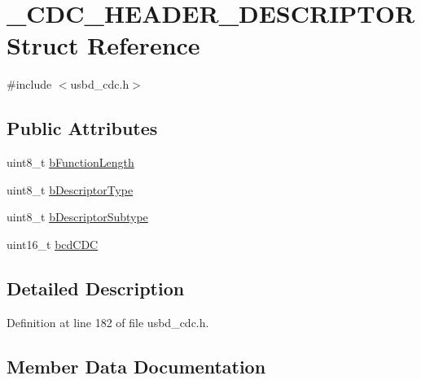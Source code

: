 \hypertarget{struct___c_d_c___h_e_a_d_e_r___d_e_s_c_r_i_p_t_o_r}{}\section{\+\_\+\+C\+D\+C\+\_\+\+H\+E\+A\+D\+E\+R\+\_\+\+D\+E\+S\+C\+R\+I\+P\+T\+OR Struct Reference}
\label{struct___c_d_c___h_e_a_d_e_r___d_e_s_c_r_i_p_t_o_r}


{\ttfamily \#include $<$usbd\+\_\+cdc.\+h$>$}

\subsection*{Public Attributes}
\begin{DoxyCompactItemize}
\item 
uint8\+\_\+t \hyperlink{struct___c_d_c___h_e_a_d_e_r___d_e_s_c_r_i_p_t_o_r_a0b88951b1e043616876d35573a6d85ed}{b\+Function\+Length}
\item 
uint8\+\_\+t \hyperlink{struct___c_d_c___h_e_a_d_e_r___d_e_s_c_r_i_p_t_o_r_acd21e37337cf4879585dfe4b13747b9c}{b\+Descriptor\+Type}
\item 
uint8\+\_\+t \hyperlink{struct___c_d_c___h_e_a_d_e_r___d_e_s_c_r_i_p_t_o_r_a8023a40a5a8e7231ad509f2f1427e37b}{b\+Descriptor\+Subtype}
\item 
uint16\+\_\+t \hyperlink{struct___c_d_c___h_e_a_d_e_r___d_e_s_c_r_i_p_t_o_r_a2650cd685ca91a2b3d3c046057287d46}{bcd\+C\+DC}
\end{DoxyCompactItemize}


\subsection{Detailed Description}


Definition at line 182 of file usbd\+\_\+cdc.\+h.



\subsection{Member Data Documentation}
\mbox{\label{struct___c_d_c___h_e_a_d_e_r___d_e_s_c_r_i_p_t_o_r_a2650cd685ca91a2b3d3c046057287d46}} 
